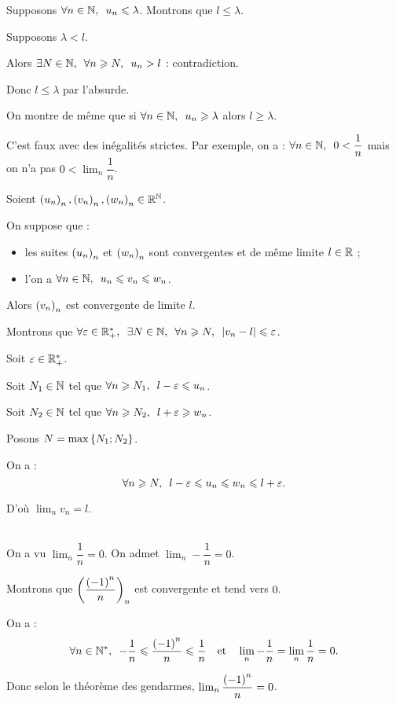 \begin{dem}
Supposons \(\quantifs{\forall n\in\N}u_n\leq\lambda\). Montrons que \(l\leq\lambda\).

Supposons \(\lambda<l\).

Alors \(\quantifs{\exists N\in\N;\forall n\geq N}u_n>l\) : contradiction.

Donc \(l\leq\lambda\) par l'absurde.

On montre de même que si \(\quantifs{\forall n\in\N}u_n\geq\lambda\) alors \(l\geq\lambda\).
\end{dem}

\begin{rem}
C'est faux avec des inégalités strictes. Par exemple, on a : \(\quantifs{\forall n\in\N}0<\dfrac{1}{n}\) mais on n'a pas \(0<\lim_n\dfrac{1}{n}\).
\end{rem}

\begin{theo}\label{theo:gendarmes}
Soient \(\left(u_n\right)_n,\left(v_n\right)_n,\left(w_n\right)_n\in\mathbb{R}^{\mathbb{N}}\).

On suppose que : \begin{itemize}
\item les suites \(\left(u_n\right)_n\) et \(\left(w_n\right)_n\) sont convergentes et de même limite \(l\in\mathbb{R}\) ;
\item l'on a \(\quantifs{\forall n\in\N}u_n\leq v_n\leq w_n\). \\
\end{itemize}

Alors \(\left(v_n\right)_n\) est convergente de limite \(l\).
\end{theo}

\begin{dem}
Montrons que \(\quantifs{\forall\epsilon\in\Rps;\exists N\in\N;\forall n\geq N}\abs{v_n-l}\leq\epsilon\).

Soit \(\varepsilon\in\mathbb{R}_+^*\).

Soit \(N_1\in\mathbb{N}\) tel que \(\quantifs{\forall n\geq N_1}l-\epsilon\leq u_n\).

Soit \(N_2\in\mathbb{N}\) tel que \(\quantifs{\forall n\geq N_2}l+\epsilon\geq w_n\).

Posons \(N=\max\left\lbrace N_1;N_2\right\rbrace\).

On a : \[\quantifs{\forall n\geq N}l-\epsilon\leq u_n\leq w_n\leq l+\epsilon.\]

D'où \(\lim_nv_n=l\).
\end{dem}

\begin{ex}~\\
On a vu \(\lim_n\dfrac{1}{n}=0\). On admet \(\lim_n-\dfrac{1}{n}=0\).

Montrons que \(\left(\dfrac{\left(-1\right)^n}{n}\right)_n\) est convergente et tend vers \(0\).

On a : \[\quantifs{\forall n\in\Ns}-\dfrac{1}{n}\leq\dfrac{\paren{-1}^n}{n}\leq\dfrac{1}{n}\quad\text{et}\quad\lim_n-\dfrac{1}{n}=\lim_n\dfrac{1}{n}=0.\]

Donc selon le théorème des gendarmes, \(\lim_n\dfrac{\left(-1\right)^n}{n}=0\).
\end{ex}

